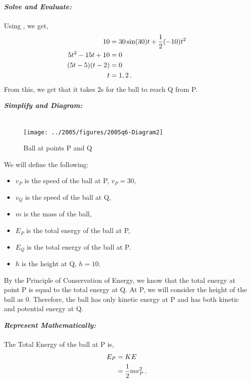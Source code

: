 \begin{subquestions}
\textbf{\textit{Solve and Evaluate:}} \\ \\
Using , we get,
\begin{align}
	10 & = 30\sin(30)t + \frac{1}{2}(-10)t^2 \nonumber \\
	5t^2-15t+10 & = 0 \nonumber \\
	(5t-5)(t-2) & = 0 \nonumber \\
	t & = 1, 2 \,.
\end{align}
From this, we get that it takes 2s for the ball to reach Q from P.


\subquestion 

\textbf{\textit{Simplify and Diagram:}} \\ \\
\begin{figure}[H] 
	\begin{center}
		\hspace{20pt}\texttt{[image: ../2005/figures/2005q6-Diagram2]}
		\caption{\label{2005:q6:Diagram2} Ball at points P and Q}
	\end{center}
\end{figure}
We will define the following:
\begin{itemize}
	\item $v_P$ is the speed of the ball at P, $v_P=30$,
	\item $v_Q$ is the speed of the ball at Q,
	\item $m$ is the mass of the ball,
	\item $E_P$ is the total energy of the ball at P,
	\item $E_Q$ is the total energy of the ball at P.
	\item $h$ is the height at Q, $h=10$.
\end{itemize}
By the Principle of Conservation of Energy, we know that the total energy at point P is equal to the total energy at Q. At P, we will consider the height of the ball as 0. Therefore, the ball has only kinetic energy at P and has both kinetic and potential energy at Q.





\textbf{\textit{Represent Mathematically:}} \\ \\
The Total Energy of the ball at P is,
\begin{align}
	E_P & = KE \nonumber \\
	    & = \frac{1}{2}mv_P^2 \,.
\end{align}


\end{subquestions}
